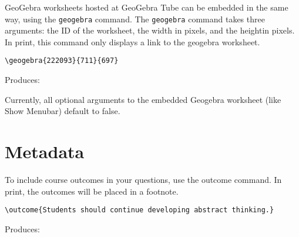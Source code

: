 \documentclass{ximera}
\begin{document}
\begin{example} GeoGebra worksheets hosted at GeoGebra Tube can be embedded in the same way, using the \verb!geogebra! command. The \verb!geogebra! command takes three arguments: the ID of the worksheet, the width in pixels, and the heightin pixels. In print, this command only displays a link to the geogebra worksheet.

\begin{verbatim}
\geogebra{222093}{711}{697}
\end{verbatim}

Produces: 


\begin{remark} 
  Currently, all optional arguments to the embedded Geogebra worksheet (like Show Menubar) default to false.
\end{remark}

\end{example}

\section{Metadata} \label{Metadata}

\begin{example} To include course outcomes in your questions, use the outcome command. In print, the outcomes will be placed in a footnote.

\begin{verbatim}
\outcome{Students should continue developing abstract thinking.}
\end{verbatim}

Produces:

\end{example}
\end{document}
